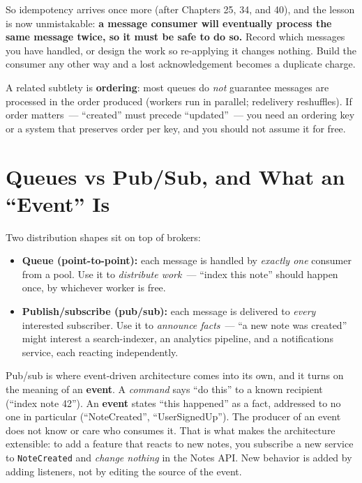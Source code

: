 \noindent{}So idempotency arrives once more (after Chapters 25, 34, and 40), and the lesson is now unmistakable: \textbf{a message consumer will eventually process the same message twice, so it must be safe to do so.} Record which messages you have handled, or design the work so re-applying it changes nothing. Build the consumer any other way and a lost acknowledgement becomes a duplicate charge.

A related subtlety is \textbf{ordering}: most queues do \emph{not} guarantee messages are processed in the order produced (workers run in parallel; redelivery reshuffles). If order matters~--- ``created'' must precede ``updated''~--- you need an ordering key or a system that preserves order per key, and you should not assume it for free.

\setcounter{section}{3}
\section{Queues vs Pub/Sub, and What an ``Event'' Is}\label{41-event-driven-architecture:414-queues-vs-pubsub-and-what-an-event-is}

Two distribution shapes sit on top of brokers:

\begin{itemize}
\tightlist
\item
  \textbf{Queue (point-to-point):} each message is handled by \emph{exactly one} consumer from a pool. Use it to \emph{distribute work}~--- ``index this note'' should happen once, by whichever worker is free.
\item
  \textbf{Publish/subscribe (pub/sub):} each message is delivered to \emph{every} interested subscriber. Use it to \emph{announce facts}~--- ``a new note was created'' might interest a search-indexer, an analytics pipeline, and a notifications service, each reacting independently.
\end{itemize}

\noindent{}Pub/sub is where event-driven architecture comes into its own, and it turns on the meaning of an \textbf{event}. A \emph{command} says ``do this'' to a known recipient (``index note 42''). An \textbf{event} states ``this happened'' as a fact, addressed to no one in particular (``NoteCreated'', ``UserSignedUp''). The producer of an event does not know or care who consumes it. That is what makes the architecture extensible: to add a feature that reacts to new notes, you subscribe a new service to \texttt{NoteCreated} and \emph{change nothing} in the Notes API. New behavior is added by adding listeners, not by editing the source of the event.

